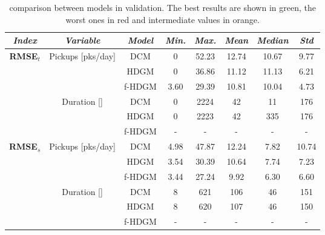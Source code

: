 \begin{table}[h!]
	\centering
	\renewcommand\arraystretch{1.3}
	\begin{tabular}{c|c|c|c|c|c|c|c}
		\hline
		\textit{Index} & \textit{Variable} & \textit{Model} & \textit{Min.} & \textit{Max.} & \textit{Mean} & \textit{Median} & \textit{Std}\\
		\hline
		\multirow{6}{4em}{\textbf{RMSE$_t$}} & \multirow{3}{4em}{Pickups [pks/day]} & DCM & \cellcolor{green}\num{0} & \cellcolor{red}\num{52.23} & \cellcolor{red}\num{12.74} & \cellcolor{orange}\num{10.67} & \cellcolor{red}\num{9.77} \\ \cline{3-8}
		& & HDGM & \cellcolor{green}\num{0} & \cellcolor{orange}\num{36.86} & \cellcolor{orange}\num{11.12} & \cellcolor{red}\num{11.13} & \cellcolor{orange}\num{6.21} \\ \cline{3-8}
		& & f-HDGM & \cellcolor{red}\num{3.60} & \cellcolor{green}\num{29.39} & \cellcolor{green}\num{10.81} & \cellcolor{green}\num{10.04} & \cellcolor{green}\num{4.73} \\ \cline{2-8}
		& \multirow{3}{4em}{Duration [\si{\min}]} & DCM & \cellcolor{green}\num{0} & \cellcolor{red}\num{2224} & \cellcolor{green}\num{42} & \cellcolor{green}\num{11} & \cellcolor{green}\num{176} \\ \cline{3-8} 
		& & HDGM & \cellcolor{green}\num{0} & \cellcolor{green}\num{2223} & \cellcolor{green}\num{42} & \cellcolor{red}\num{335} & \cellcolor{green}\num{176} \\ \cline{3-8}
		& & f-HDGM & - & - & - & - & - \\
		\hline
		\multirow{6}{4em}{\textbf{RMSE$_s$}} & \multirow{3}{4em}{Pickups [pks/day]} & DCM & \cellcolor{red}\num{4.98} & \cellcolor{red}\num{47.87} & \cellcolor{red}\num{12.24} & \cellcolor{red}\num{7.82} & \cellcolor{red}\num{10.74} \\ \cline{3-8}
		& & HDGM & \cellcolor{orange}\num{3.54} & \cellcolor{orange}\num{30.39} & \cellcolor{orange}\num{10.64} & \cellcolor{orange}\num{7.74} & \cellcolor{orange}\num{7.23} \\ \cline{3-8}
		& & f-HDGM & \cellcolor{green}\num{3.44} & \cellcolor{green}\num{27.24} & \cellcolor{green}\num{9.92} & \cellcolor{green}\num{6.30} & \cellcolor{green}\num{6.60} \\ \cline{2-8}
		& \multirow{3}{4em}{Duration [\si{\min}]} & DCM & \cellcolor{green}\num{8} & \cellcolor{red}\num{621} & \cellcolor{green}\num{106} & \cellcolor{green}\num{46} & \cellcolor{red}\num{151} \\ \cline{3-8} 
		& & HDGM & \cellcolor{green}\num{8} & \cellcolor{green}\num{620} & \cellcolor{red}\num{107} & \cellcolor{green}\num{46} & \cellcolor{green}\num{150} \\ \cline{3-8}
		& & f-HDGM & - & - & - & - & - \\
		\hline
	\end{tabular}
	\caption[Comparison between models in validation]{comparison between models in validation. The best results are shown in green, the worst ones in red and intermediate values in orange.}
	\label{RMSE_final_comp}
\end{table}

